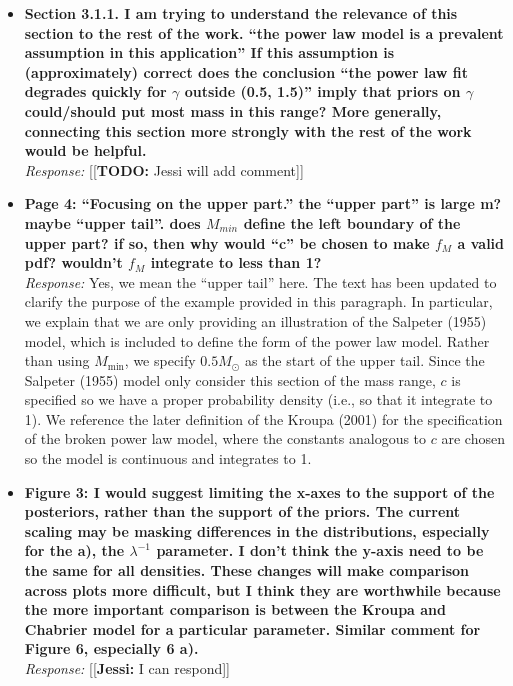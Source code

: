 \documentclass[11pt, oneside]{article}   	%
\newcommand{\jessi}[1]{{\color{blue}[[\textbf{Jessi: }#1]]}}
\newcommand{\todo}[1]{{\color{red}[[\textbf{TODO: }#1]]}}
\newcommand{\Msun}{M_{\odot}}
\begin{document}
\begin{itemize}
\item  {\bf Section 3.1.1. I am trying to understand the relevance of this section to the rest of the work. ``the power law model is a prevalent assumption in this application'' If this assumption is (approximately) correct does the conclusion ``the power law fit degrades quickly for $\gamma$ outside (0.5, 1.5)'' imply that priors on $\gamma$ could/should put most mass in this range? More generally, connecting this section more strongly with the rest of the work would be helpful.} \\
\noindent \emph{Response:} \todo{Jessi will add comment}
\bigskip

\item {\bf Page 4: ``Focusing on the upper part.'' the ``upper part'' is large m? maybe ``upper tail''. does $M_{min}$ define the left boundary of the upper part? if so, then why would ``c'' be chosen to make $f_M$ a valid pdf? wouldn't $f_M$ integrate to less than 1?} \\
\noindent \emph{Response:} Yes, we mean the ``upper tail'' here.  The text has been updated to clarify the purpose of the example provided in this paragraph.  In particular, we explain that we are only providing an illustration of the Salpeter (1955) model, which is included to define the form of the power law model.  Rather than using $M_{\min}$, we specify $0.5\Msun$ as the start of the upper tail.  Since the Salpeter (1955) model only consider this section of the mass range, $c$ is specified so we have a proper probability density (i.e., so that it integrate to 1).  We reference the later definition of the Kroupa (2001) for the specification of the broken power law model, where the constants analogous to $c$ are chosen so the model is continuous and integrates to 1.
\bigskip

\item {\bf Figure 3: I would suggest limiting the x-axes to the support of the posteriors, rather than the support of the priors. The current scaling may be masking differences in the
distributions, especially for the a), the $\lambda^{-1}$ parameter. I don't think the y-axis need to be the same for all densities. These changes will make comparison across plots more difficult, but I think they are worthwhile because the more important comparison is between the Kroupa and Chabrier model for a particular parameter. Similar comment for Figure 6, especially 6 a).} \\
\noindent \emph{Response:} \jessi{I can respond}
\bigskip


\end{itemize}
\end{document}
